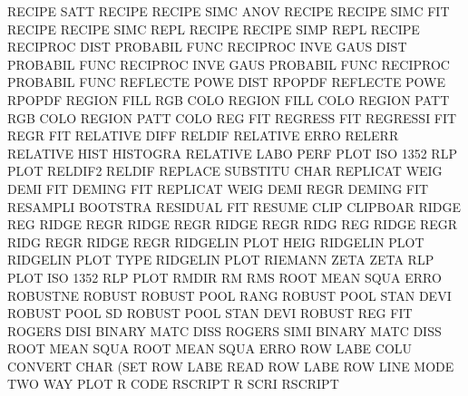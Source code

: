 RECIPE   SATT                           RECIPE
RECIPE   SIMC ANOV                      RECIPE
RECIPE   SIMC FIT                       RECIPE
RECIPE   SIMC REPL                      RECIPE
RECIPE   SIMP REPL                      RECIPE
RECIPROC DIST                           PROBABIL FUNC
RECIPROC INVE GAUS DIST                 PROBABIL FUNC
RECIPROC INVE GAUS                      PROBABIL FUNC
RECIPROC                                PROBABIL FUNC
REFLECTE POWE DIST                      RPOPDF
REFLECTE POWE                           RPOPDF
REGION   FILL RGB  COLO                 REGION   FILL COLO
REGION   PATT RGB  COLO                 REGION   PATT COLO
REG                                     FIT
REGRESS                                 FIT
REGRESSI                                FIT
REGR                                    FIT
RELATIVE DIFF                           RELDIF
RELATIVE ERRO                           RELERR
RELATIVE HIST                           HISTOGRA
RELATIVE LABO PERF PLOT                 ISO      1352 RLP  PLOT
RELDIF2                                 RELDIF
REPLACE                                 SUBSTITU CHAR
REPLICAT WEIG DEMI FIT                  DEMING   FIT
REPLICAT WEIG DEMI REGR                 DEMING   FIT
RESAMPLI                                BOOTSTRA
RESIDUAL                                FIT
RESUME   CLIP                           CLIPBOAR
RIDGE    REG                            RIDGE    REGR
RIDGE    REGR                           RIDGE    REGR
RIDG     REG                            RIDGE    REGR
RIDG     REGR                           RIDGE    REGR
RIDGELIN PLOT HEIG                      RIDGELIN PLOT
RIDGELIN PLOT TYPE                      RIDGELIN PLOT
RIEMANN  ZETA                           ZETA
RLP      PLOT                           ISO      1352 RLP  PLOT
RMDIR                                   RM
RMS                                     ROOT     MEAN SQUA ERRO
ROBUSTNE                                ROBUST
ROBUST   POOL RANG                      ROBUST   POOL STAN DEVI
ROBUST   POOL SD                        ROBUST   POOL STAN DEVI
ROBUST   REG                            FIT
ROGERS   DISI                           BINARY   MATC DISS
ROGERS   SIMI                           BINARY   MATC DISS
ROOT     MEAN SQUA                      ROOT     MEAN SQUA ERRO
ROW      LABE COLU                      CONVERT  CHAR (SET
ROW      LABE                           READ     ROW  LABE
ROW      LINE MODE                      TWO      WAY  PLOT
R        CODE                           RSCRIPT
R        SCRI                           RSCRIPT
